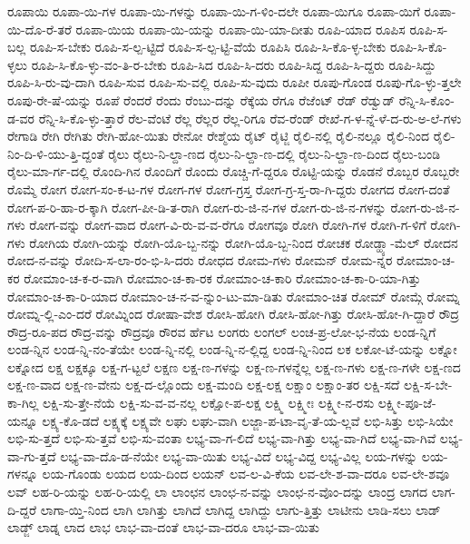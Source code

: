 {ರೂಪಾಯಿ
ರೂಪಾ-ಯಿ-ಗಳ
ರೂಪಾ-ಯಿ-ಗಳನ್ನು
ರೂಪಾ-ಯಿ-ಗ-ಳಿಂ-ದಲೇ
ರೂಪಾ-ಯಿಗೂ
ರೂಪಾ-ಯಿಗೆ
ರೂಪಾ-ಯಿ-ದೊ-ರೆ-ತರೆ
ರೂಪಾ-ಯಿಯ
ರೂಪಾ-ಯಿ-ಯನ್ನು
ರೂಪಾ-ಯಿ-ಯಾ-ದೀತು
ರೂಪಿ-ಯಾದ
ರೂಪಿಸ
ರೂಪಿ-ಸ-ಬಲ್ಲ
ರೂಪಿ-ಸ-ಬೇಕು
ರೂಪಿ-ಸ-ಲ್ಪ-ಟ್ಟಿದೆ
ರೂಪಿ-ಸ-ಲ್ಪ-ಟ್ಟಿ-ವೆಯೆ
ರೂಪಿಸಿ
ರೂಪಿ-ಸಿ-ಕೊ-ಳ್ಳ-ಬೇಕು
ರೂಪಿ-ಸಿ-ಕೊ-ಳ್ಳಲು
ರೂಪಿ-ಸಿ-ಕೊ-ಳ್ಳು-ವಂ-ತಿ-ರ-ಬೇಕು
ರೂಪಿ-ಸಿದ
ರೂಪಿ-ಸಿ-ದರು
ರೂಪಿ-ಸಿದ್ದ
ರೂಪಿ-ಸಿ-ದ್ದರು
ರೂಪಿ-ಸಿದ್ದು
ರೂಪಿ-ಸಿ-ರು-ವು-ದಾಗಿ
ರೂಪಿ-ಸುವ
ರೂಪಿ-ಸು-ವಲ್ಲಿ
ರೂಪಿ-ಸು-ವುದು
ರೂಪೀ
ರೂಪು-ಗೊಂಡ
ರೂಪು-ಗೊ-ಳ್ಳು-ತ್ತಲೇ
ರೂಪು-ರೇ-ಷೆ-ಯನ್ನು
ರೂಪೆ
ರೆಂದರೆ
ರೆಂದು
ರೆಂಬು-ದನ್ನು
ರೆಕ್ಕೆಯ
ರೆಗೂ
ರೆಜೆಂಟ್
ರೆಡ್
ರೆಡ್ವುಡ್
ರೆನ್ನಿ-ಸಿ-ಕೊಂ-ಡ-ವರ
ರೆನ್ನಿ-ಸಿ-ಕೊ-ಳ್ಳು-ತ್ತಾರೆ
ರೆಲ-ವೆಂಟೆ
ರೆಲ್ಲ
ರೆಲ್ಲರ
ರೆಲ್ಲ-ರಿಗೂ
ರೆವ-ರೆಂಡ್
ರೇಖೆ-ಗ-ಳ-ನ್ನೆ-ಳೆ-ದ-ರು-ಅ-ಲೆ-ಗಳು
ರೇಗಾಡಿ
ರೇಗಿ
ರೇಗಿತು
ರೇಗಿ-ಹೋ-ಯಿತು
ರೇನೋ
ರೇಶ್ಮೆಯ
ರೈಟ್
ರೈಟ್ಜಿ
ರೈಲಿ-ನಲ್ಲಿ
ರೈಲಿ-ನಲ್ಲೂ
ರೈಲಿ-ನಿಂದ
ರೈಲಿ-ನಿಂ-ದಿ-ಳಿ-ಯು-ತ್ತಿ-ದ್ದಂತೆ
ರೈಲು
ರೈಲು-ನಿ-ಲ್ದಾ-ಣದ
ರೈಲು-ನಿ-ಲ್ದಾ-ಣ-ದಲ್ಲಿ
ರೈಲು-ನಿ-ಲ್ದಾ-ಣ-ದಿಂದ
ರೈಲು-ಬಂಡಿ
ರೈಲು-ಮಾ-ರ್ಗ-ದಲ್ಲಿ
ರೊಂದಿ-ಗಿನ
ರೊಂದಿಗೆ
ರೊಂದು
ರೊಚ್ಚಿ-ಗೆ-ದ್ದರೂ
ರೊಟ್ಟಿ-ಯನ್ನು
ರೊಡನೆ
ರೊಬ್ಬರ
ರೊಬ್ಬರೇ
ರೊಮ್ಮೆ
ರೋಗ
ರೋಗ-ಸಂ-ಕ-ಟ-ಗಳ
ರೋಗ-ಗಳ
ರೋಗ-ಗ್ರಸ್ತ
ರೋಗ-ಗ್ರ-ಸ್ತ-ರಾ-ಗಿ-ದ್ದರು
ರೋಗದ
ರೋಗ-ದಂತೆ
ರೋಗ-ಪ-ರಿ-ಹಾ-ರ-ಕ್ಕಾಗಿ
ರೋಗ-ಪೀ-ಡಿ-ತ-ರಾಗಿ
ರೋಗ-ರು-ಜಿ-ನ-ಗಳ
ರೋಗ-ರು-ಜಿ-ನ-ಗಳನ್ನು
ರೋಗ-ರು-ಜಿ-ನ-ಗಳು
ರೋಗ-ವನ್ನು
ರೋಗ-ವಾದ
ರೋಗ-ವಿ-ರು-ವ-ವ-ರೆಗೂ
ರೋಗವೂ
ರೋಗಿ
ರೋಗಿ-ಗಳ
ರೋಗಿ-ಗ-ಳಿಗೆ
ರೋಗಿ-ಗಳು
ರೋಗಿಯ
ರೋಗಿ-ಯನ್ನು
ರೋಗಿ-ಯೊ-ಬ್ಬ-ನನ್ನು
ರೋಗಿ-ಯೊ-ಬ್ಬ-ನಿಂದ
ರೋಚಕ
ರೋಡ್ಹ್ಯಾ-ಮೆಲ್
ರೋದನ
ರೋದ-ನ-ವನ್ನು
ರೋದಿ-ಸ-ಲಾ-ರಂ-ಭಿ-ಸಿ-ದರು
ರೋಧದ
ರೋಮ-ಗಳು
ರೋಮನ್
ರೋಮ-ನ್ನರ
ರೋಮಾಂ-ಚ-ಕರ
ರೋಮಾಂ-ಚ-ಕ-ರ-ವಾಗಿ
ರೋಮಾಂ-ಚ-ಕಾ-ರಕ
ರೋಮಾಂ-ಚ-ಕಾರಿ
ರೋಮಾಂ-ಚ-ಕಾ-ರಿ-ಯಾ-ಗಿತ್ತು
ರೋಮಾಂ-ಚ-ಕಾ-ರಿ-ಯಾದ
ರೋಮಾಂ-ಚ-ನ-ವ-ನ್ನುಂ-ಟು-ಮಾ-ಡಿತು
ರೋಮಾಂ-ಚಿತ
ರೋಮ್
ರೋಮ್ಗೆ
ರೋಮ್ನ
ರೋಮ್ನ-ಲ್ಲಿ-ಎಂ-ದರೆ
ರೋಮ್ನಿಂದ
ರೋಷಾ-ವೇಶ
ರೋಸಿ-ಹೋಗಿ
ರೋಸಿ-ಹೋ-ಗಿತ್ತು
ರೋಸಿ-ಹೋ-ಗಿ-ದ್ದಾರೆ
ರೌದ್ರ
ರೌದ್ರ-ರೂ-ಪದ
ರೌದ್ರ-ವನ್ನು
ರೌದ್ರವೂ
ರೌರವ
ರ್ಹೆಟ
ಲಂಗರು
ಲಂಗಲ್
ಲಂಚ-ಪ್ರ-ಲೋ-ಭ-ನೆಯ
ಲಂಡ-ನ್ನಿಗೆ
ಲಂಡ-ನ್ನಿನ
ಲಂಡ-ನ್ನಿ-ನಂ-ತೆಯೇ
ಲಂಡ-ನ್ನಿ-ನಲ್ಲಿ
ಲಂಡ-ನ್ನಿ-ನ-ಲ್ಲಿದ್ದ
ಲಂಡ-ನ್ನಿ-ನಿಂದ
ಲಕ
ಲಕೋ-ಟೆ-ಯನ್ನು
ಲಕ್ನೋ
ಲಕ್ನೋದ
ಲಕ್ಷ
ಲಕ್ಷಕ್ಕೂ
ಲಕ್ಷ-ಗ-ಟ್ಟಲೆ
ಲಕ್ಷಣ
ಲಕ್ಷ-ಣ-ಗಳನ್ನು
ಲಕ್ಷ-ಣ-ಗಳನ್ನೆಲ್ಲ
ಲಕ್ಷ-ಣ-ಗಳು
ಲಕ್ಷ-ಣ-ಗಳೇ
ಲಕ್ಷ-ಣದ
ಲಕ್ಷ-ಣ-ವಾದ
ಲಕ್ಷ-ಣ-ವೇನು
ಲಕ್ಷ-ದ-ಲ್ಲೊಂದು
ಲಕ್ಷ-ಮಂದಿ
ಲಕ್ಷ-ಲಕ್ಷ
ಲಕ್ಷಾಂ
ಲಕ್ಷಾಂ-ತರ
ಲಕ್ಷಿ-ಸದೆ
ಲಕ್ಷಿ-ಸ-ಬೇ-ಕಾ-ಗಿಲ್ಲ
ಲಕ್ಷಿ-ಸು-ತ್ತೇ-ನೆಯೆ
ಲಕ್ಷಿ-ಸು-ವ-ವ-ನಲ್ಲ
ಲಕ್ಷೋ-ಪ-ಲಕ್ಷ
ಲಕ್ಷ್ಮಿ
ಲಕ್ಷ್ಮೀಃ
ಲಕ್ಷ್ಮೀ-ನ-ರಸು
ಲಕ್ಷ್ಮೀ-ಪೂ-ಜೆ-ಯನ್ನೂ
ಲಕ್ಷ್ಯ-ಕೊ-ಡದೆ
ಲಕ್ಷ್ಯಕ್ಕೆ
ಲಕ್ಷ್ಯವೇ
ಲಘು
ಲಘು-ವಾಗಿ
ಲಜ್ಜಾ-ಪ-ಟಾ-ವೃ-ತೆ-ಯ-ಲ್ಲವೆ
ಲಭಿ-ಸಿತ್ತು
ಲಭಿ-ಸಿಯೇ
ಲಭಿ-ಸು-ತ್ತದೆ
ಲಭಿ-ಸು-ತ್ತವೆ
ಲಭಿ-ಸು-ವಂತಾ
ಲಭ್ಯ-ವಾ-ಗ-ಲಿದೆ
ಲಭ್ಯ-ವಾ-ಗಿತ್ತು
ಲಭ್ಯ-ವಾ-ಗಿದೆ
ಲಭ್ಯ-ವಾ-ಗಿವೆ
ಲಭ್ಯ-ವಾ-ಗು-ತ್ತದೆ
ಲಭ್ಯ-ವಾ-ದೊ-ಡ-ನೆಯೇ
ಲಭ್ಯ-ವಾ-ಯಿತು
ಲಭ್ಯ-ವಿದೆ
ಲಭ್ಯ-ವಿದ್ದ
ಲಭ್ಯ-ವಿಲ್ಲ
ಲಯ-ಗಳನ್ನು
ಲಯ-ಗಳನ್ನೂ
ಲಯ-ಗೊಂಡು
ಲಯದ
ಲಯ-ದಿಂದ
ಲಯನ್
ಲವ-ಲ-ವಿ-ಕೆಯ
ಲವ-ಲೇ-ಶ-ವಾ-ದರೂ
ಲವ-ಲೇ-ಶವೂ
ಲವ್
ಲಹ-ರಿ-ಯನ್ನು
ಲಹ-ರಿ-ಯಲ್ಲಿ
ಲಾ
ಲಾಂಛನ
ಲಾಂಛ-ನ-ವನ್ನು
ಲಾಂಛ-ನ-ವೊಂ-ದನ್ನು
ಲಾಂದ್ರ
ಲಾಗದ
ಲಾಗ-ದಿ-ದ್ದರೆ
ಲಾಗಾ-ಯ್ತಿ-ನಿಂದ
ಲಾಗಿ
ಲಾಗಿತ್ತು
ಲಾಗಿದೆ
ಲಾಗಿದ್ದ
ಲಾಗಿದ್ದು
ಲಾಗು-ತ್ತಿತ್ತು
ಲಾಟೀನು
ಲಾಡಿ-ಸಲು
ಲಾಡ್
ಲಾಡ್ಜ್
ಲಾಡ್ನ
ಲಾದ
ಲಾಭ
ಲಾಭ-ವಾ-ದಂತೆ
ಲಾಭ-ವಾ-ದರೂ
ಲಾಭ-ವಾ-ಯಿತು
}
